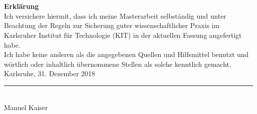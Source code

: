 \chapter*{}
\begin{flushleft}
\vspace{5cm}
\textbf{Erklärung}\\[0,5cm]
Ich versichere hiermit, dass ich meine Masterarbeit selbständig und unter Beachtung der Regeln zur Sicherung guter wissenschaftlicher Praxis im Karlsruher Institut für Technologie (KIT) in der aktuellen Fassung angefertigt habe. \\
Ich habe keine anderen als die angegebenen Quellen und Hilfsmittel benutzt und wörtlich oder inhaltlich übernommene Stellen als solche kenntlich gemacht.\\[1cm]

Karlsruhe, 31. Dezember 2018 \\[2cm]

\rule{5cm}{0.4pt} \\

Manuel Kaiser

\end{flushleft}
